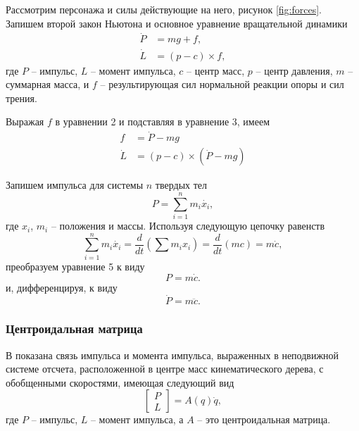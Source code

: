 Рассмотрим персонажа и силы действующие на него, рисунок \ref{fig:forces}. Запишем второй закон Ньютона и основное уравнение вращательной динамики
\begin{align}
\dot{P} &= mg + f, \\
\dot{L} &= (p - c) \times f,
\end{align}
где $P$ -- импульс, $L$ -- момент импульса, $c$ -- центр масс, $p$ -- центр давления, $m$ -- суммарная масса, и $f$ -- результирующая сил нормальной реакции опоры и сил трения.

Выражая $f$ в уравнении 2 и подставляя в уравнение 3, имеем
\begin{align}
f &= \dot{P} - mg \\
\dot{L} &= (p - c) \times (\dot{P} - mg)
\end{align}

Запишем импульса для системы $n$ твердых тел
\begin{equation}
P = \sum_{i = 1}^{n} m_{i} \dot{x_{i}},
\end{equation}
где $x_{i}$, $m_{i}$ -- положения и массы. Используя следующую цепочку равенств
\begin{equation}
\sum_{i = 1}^{n} m_{i} \dot{x_{i}} = \frac{d}{dt} (\sum m_{i} x_{i}) = \frac{d}{dt} (mc) = m \dot{c},
\end{equation}
преобразуем уравнение 5 к виду
\begin{equation}
P = m \dot{c}.
\end{equation}
и, дифференцируя, к виду
\begin{equation}
  \dot{P} = m \ddot{c}.
\end{equation}

\subsubsection{Центроидальная матрица}


В \cite{OrinG} показана связь импульса и момента импульса, выраженных в неподвижной системе отсчета, расположенной в центре масс кинематического дерева, с обобщенными скоростями, имеющая следующий вид
\begin{equation}
\begin{bmatrix} P\\ L \end{bmatrix} = A(q) \dot{q},
\end{equation}
где $P$ -- импульс, $L$ -- момент импульса, а $A$ -- это центроидальная матрица.

